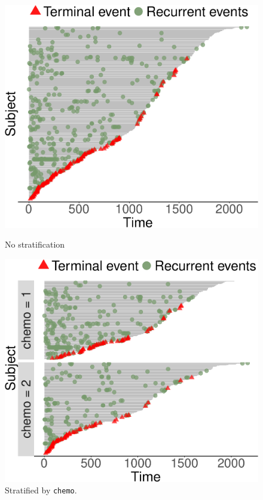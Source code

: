 \vspace*{-.3cm}
\begin{figure}[H]
    \centering
    \begin{minipage}{0.245\textwidth}
        \centering
        \includegraphics[scale = .25]{images/ep-1}
        \caption{No stratification}
    \end{minipage}\hfill
    \begin{minipage}{0.245\textwidth}
        \centering
        \includegraphics[scale = .25]{images/ep-2}
        \caption{Stratified by \texttt{chemo}.}
    \end{minipage}
\end{figure}
